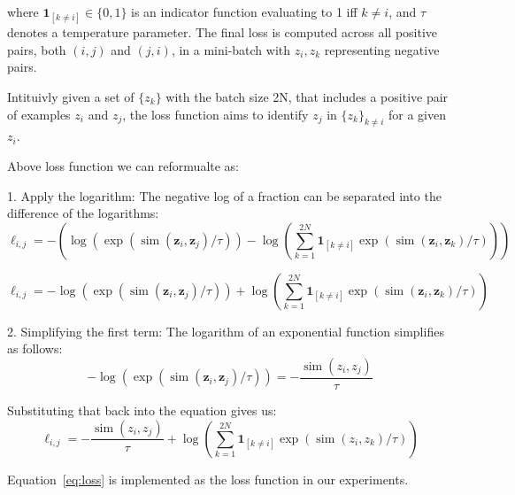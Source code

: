 where \(\mathbf{1}_{[k \neq i]} \in \{0, 1\}\) is an indicator function evaluating to 1 iff \(k \neq i\), and \(\tau\) denotes a temperature parameter.
The final loss is computed across all positive pairs, both \((i, j)\) and \((j, i)\), in a mini-batch with $z_i, z_k$ representing negative pairs.



Intituivly given a set of \( \{ z_k \} \) with the batch size 2N, that includes a positive pair of examples \( z_i \) and \( z_j \), the loss function aims 
to identify \( z_j \) in \( \{ z_k \}_{k \neq i} \) for a given \( z_i \).

  
Above loss function we can reformualte as:

1. Apply the logarithm: The negative log of a fraction can be separated into the difference of the logarithms:
\[
\ell_{i, j} = -\left( \log \left(\exp \left(\operatorname{sim}\left(\boldsymbol{z}_i, \boldsymbol{z}_j\right) / \tau\right)\right) - \log\left( \sum_{k=1}^{2 N} \mathbf{1}_{[k \neq i]} \exp \left(\operatorname{sim}\left(\boldsymbol{z}_i, \boldsymbol{z}_k\right) / \tau\right) \right) \right)
\]



\[
\ell_{i, j} = -\log \left(\exp \left(\operatorname{sim}\left(\boldsymbol{z}_i, \boldsymbol{z}_j\right) / \tau\right)\right) + \log \left( \sum_{k=1}^{2 N} \mathbf{1}_{[k \neq i]} \exp \left(\operatorname{sim}\left(\boldsymbol{z}_i, \boldsymbol{z}_k\right) / \tau\right) \right)
\]




2. Simplifying the first term: The logarithm of an exponential function simplifies as follows:
\[
-\log\left(\exp\left(\operatorname{sim}\left(\boldsymbol{z}_i, \boldsymbol{z}_j\right) / \tau\right)\right) = -\frac{\operatorname{sim}\left(z_{i}, z_{j}\right)}{\tau}
\]

Substituting that back into the equation gives us:  
\begin{equation}
\ell_{i, j} = -\frac{\operatorname{sim}\left(z_{i}, z_{j}\right)}{\tau} + \log\left(\sum_{k=1}^{2 N} \mathbf{1}_{[k \neq i]} \exp\left(\operatorname{sim}\left(z_{i}, z_{k}\right) / \tau\right)\right)
\label{eq:loss}
\end{equation}

Equation~\ref{eq:loss} is implemented as the loss function in our experiments.

